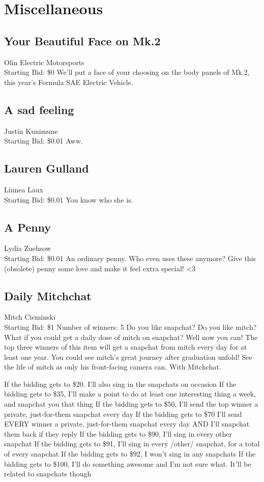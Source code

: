 \documentclass[11pt]{article}
\begin{document}
\section{Miscellaneous}
\subsection{Your Beautiful Face on Mk.2}
Olin Electric Motorsports
\\
Starting Bid: \$0
\newline
We'll put a face of your choosing on the body panels of Mk.2, this year's Formula SAE Electric Vehicle.
\subsection{A sad feeling}
Justin Kunimune
\\
Starting Bid: \$0.01
\newline
Aww.
\subsection{Lauren Gulland}
Linnea Laux
\\
Starting Bid: \$0.01
\newline
You know who she is.
\subsection{A Penny}
Lydia Zuehsow
\\
Starting Bid: \$0.01
\newline
An ordinary penny. Who even uses these anymore?
Give this (obsolete) penny some love and make it feel extra special! \textless 3
\subsection{Daily Mitchchat}
Mitch Cieminski
\\
Starting Bid: \$1
\newline
Number of winners: 5
\newline
Do you like snapchat? Do you like mitch? What if you could get a daily dose of mitch on snapchat? Well now you can! The top three winners of this item will get a snapchat from mitch every day for at least one year. You could see mitch's great journey after graduation unfold! See the life of mitch as only his front-facing camera can. With Mitchchat.

If the bidding gets to \$20. I'll also sing in the snapchats on occasion
If the bidding gets to \$35, I'll make a point to do at least one interesting thing a week, and snapchat you that thing
If the bidding gets to \$50, I'll send the top winner a private, just-for-them snapchat every day
If the bidding gets to \$70 I'll send EVERY winner a private, just-for-them snapchat every day AND I'll snapchat them back if they reply
If the bidding gets to \$90, I'll sing in every other snapchat
If the bidding gets to \$91, I'll sing in every /other/ snapchat, for a total of every snapchat
If the bidding gets to \$92, I won't sing in any snapchats
If the bidding gets to \$100, I'll do something awesome and I'm not sure what. It'll be related to snapchats though
\end{document}
